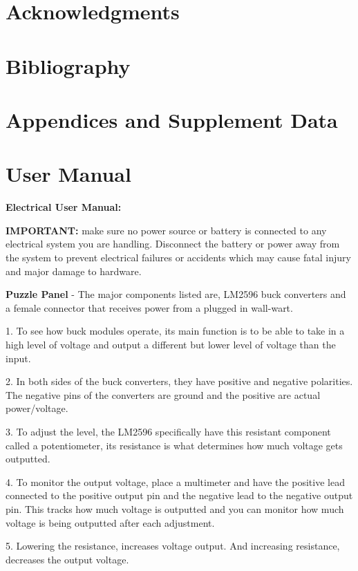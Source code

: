 \documentclass[a4paper, 10pt]{article}
\begin{document}
\section{Acknowledgments}

\section{Bibliography} 

\section{Appendices and Supplement Data}  

\section{User Manual}

\textbf{Electrical User Manual:}

\textbf{IMPORTANT:} make sure no power source or battery is connected to any electrical system you are handling. Disconnect the battery or power away from the system to prevent electrical failures or accidents which may cause fatal injury and major damage to hardware.  

\textbf{Puzzle Panel} - The major components listed are, LM2596 buck converters and a female connector that receives power from a plugged in wall-wart.

1. To see how buck modules operate, its main function is to be able to take in a high level of voltage and output a different but lower level of voltage than the input. 

2. In both sides of the buck converters, they have positive and negative polarities. The negative pins of the converters are ground and the positive are actual power/voltage.  

3. To adjust the level, the LM2596 specifically have this resistant component called a potentiometer, its resistance is what determines how much voltage gets outputted. 

4. To monitor the output voltage, place a multimeter and have the positive lead connected to the positive output pin and the negative lead to the negative output pin. This tracks how much voltage is outputted and you can monitor how much voltage is being outputted after each adjustment.

5. Lowering the resistance, increases voltage output. And increasing resistance, decreases the output voltage. 
\end{document}
